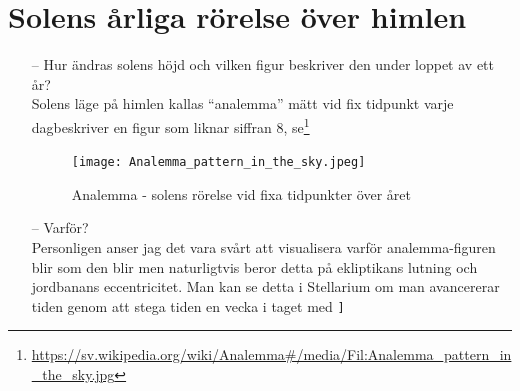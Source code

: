 \documentclass[./exercises.tex]{subfiles}
\begin{document}
\section{Solens årliga rörelse över himlen}
\begin{itemize}
\item[--] Hur ändras solens höjd och vilken figur beskriver den under loppet av ett år?\\

Solens läge på himlen kallas ``analemma'' mätt vid fix tidpunkt varje dagbeskriver en figur som liknar siffran 8, 
se\footnote{\url{https://sv.wikipedia.org/wiki/Analemma\#/media/Fil:Analemma_pattern_in_the_sky.jpg}}
\begin{figure}[H]
\centering
  \texttt{[image: Analemma\_pattern\_in\_the\_sky.jpeg]}
  \caption{Analemma - solens rörelse vid fixa tidpunkter över året}
  \label{fig4}
\end{figure}
 
\item[--]Varför? \\

Personligen anser jag det vara svårt att visualisera varför analemma-figuren blir som den blir men
naturligtvis beror detta på ekliptikans lutning och jordbanans eccentricitet.
Man kan se detta i Stellarium om man avancererar tiden genom att stega tiden en vecka i taget med \verb+]+
\end{itemize}
\newpage
\end{document}
